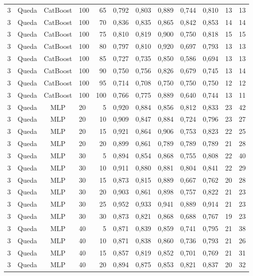 \begin{longtable}{ccclrrrrrrrr}
3 & Queda & CatBoost & 100 & 65 & 0,792 & 0,803 & 0,889 & 0,744 & 0,810 & 13 & 13 \\
3 & Queda & CatBoost & 100 & 70 & 0,836 & 0,835 & 0,865 & 0,842 & 0,853 & 14 & 14 \\
3 & Queda & CatBoost & 100 & 75 & 0,810 & 0,819 & 0,900 & 0,750 & 0,818 & 15 & 15 \\
3 & Queda & CatBoost & 100 & 80 & 0,797 & 0,810 & 0,920 & 0,697 & 0,793 & 13 & 13 \\
3 & Queda & CatBoost & 100 & 85 & 0,727 & 0,735 & 0,850 & 0,586 & 0,694 & 13 & 13 \\
3 & Queda & CatBoost & 100 & 90 & 0,750 & 0,756 & 0,826 & 0,679 & 0,745 & 13 & 14 \\
3 & Queda & CatBoost & 100 & 95 & 0,714 & 0,708 & 0,750 & 0,750 & 0,750 & 12 & 12 \\
3 & Queda & CatBoost & 100 & 100 & 0,766 & 0,775 & 0,889 & 0,640 & 0,744 & 13 & 11 \\
3 & Queda & MLP & 20 & 5 & 0,920 & 0,884 & 0,856 & 0,812 & 0,833 & 23 & 42 \\
3 & Queda & MLP & 20 & 10 & 0,909 & 0,847 & 0,884 & 0,724 & 0,796 & 23 & 27 \\
3 & Queda & MLP & 20 & 15 & 0,921 & 0,864 & 0,906 & 0,753 & 0,823 & 22 & 25 \\
3 & Queda & MLP & 20 & 20 & 0,899 & 0,861 & 0,789 & 0,789 & 0,789 & 21 & 28 \\
3 & Queda & MLP & 30 & 5 & 0,894 & 0,854 & 0,868 & 0,755 & 0,808 & 22 & 40 \\
3 & Queda & MLP & 30 & 10 & 0,911 & 0,880 & 0,881 & 0,804 & 0,841 & 22 & 29 \\
3 & Queda & MLP & 30 & 15 & 0,873 & 0,815 & 0,889 & 0,667 & 0,762 & 20 & 28 \\
3 & Queda & MLP & 30 & 20 & 0,903 & 0,861 & 0,898 & 0,757 & 0,822 & 21 & 23 \\
3 & Queda & MLP & 30 & 25 & 0,952 & 0,933 & 0,941 & 0,889 & 0,914 & 21 & 23 \\
3 & Queda & MLP & 30 & 30 & 0,873 & 0,821 & 0,868 & 0,688 & 0,767 & 19 & 23 \\
3 & Queda & MLP & 40 & 5 & 0,871 & 0,839 & 0,859 & 0,741 & 0,795 & 21 & 38 \\
3 & Queda & MLP & 40 & 10 & 0,871 & 0,838 & 0,860 & 0,736 & 0,793 & 21 & 26 \\
3 & Queda & MLP & 40 & 15 & 0,857 & 0,819 & 0,852 & 0,701 & 0,769 & 21 & 31 \\
3 & Queda & MLP & 40 & 20 & 0,894 & 0,875 & 0,853 & 0,821 & 0,837 & 20 & 32 \\

\end{longtable}
